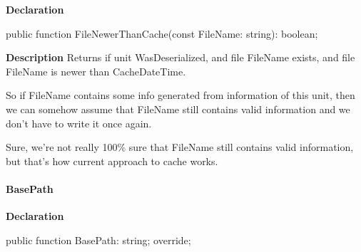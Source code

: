 \documentclass{report}
\newif\ifpdf
\begin{document}
\label{PasDoc_Items.TPasUnit-FileNewerThanCache}
\begin{list}{}{
\setlength{\itemindent}{0cm}
\setlength{\listparindent}{0cm}
\setlength{\leftmargin}{\evensidemargin}
\addtolength{\leftmargin}{\tmplength}
\settowidth{\labelsep}{X}
\addtolength{\leftmargin}{\labelsep}
\setlength{\labelwidth}{\tmplength}
}
\item[\textbf{Declaration}\hfill]
\ifpdf
\begin{flushleft}
\fi
\begin{ttfamily}
public function FileNewerThanCache(const FileName: string): boolean;\end{ttfamily}

\ifpdf
\end{flushleft}
\fi

\par
\item[\textbf{Description}]
Returns if unit WasDeserialized, and file FileName exists, and file FileName is newer than CacheDateTime.

So if FileName contains some info generated from information of this unit, then we can somehow assume that FileName still contains valid information and we don't have to write it once again.

Sure, we're not really 100{\%} sure that FileName still contains valid information, but that's how current approach to cache works.

\end{list}
\paragraph*{BasePath}\hspace*{\fill}

\label{PasDoc_Items.TPasUnit-BasePath}
\begin{list}{}{
\setlength{\itemindent}{0cm}
\setlength{\listparindent}{0cm}
\setlength{\leftmargin}{\evensidemargin}
\addtolength{\leftmargin}{\tmplength}
\settowidth{\labelsep}{X}
\addtolength{\leftmargin}{\labelsep}
\setlength{\labelwidth}{\tmplength}
}
\item[\textbf{Declaration}\hfill]
\ifpdf
\begin{flushleft}
\fi
\begin{ttfamily}
public function BasePath: string; override;\end{ttfamily}

\ifpdf
\end{flushleft}
\fi

\end{list}
\ifpdf
\end{document}
